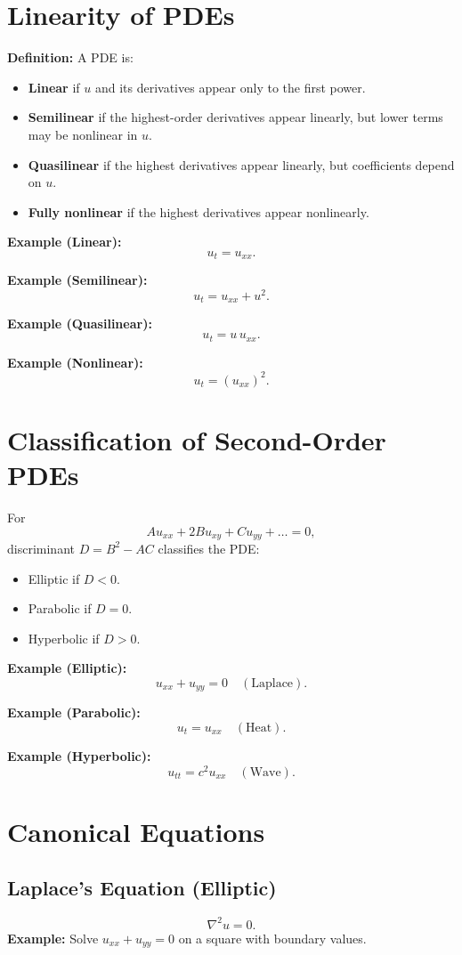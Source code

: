 \documentclass[12pt]{book}
\begin{document}
\chapter{Linearity of PDEs}
\textbf{Definition:} A PDE is:
\begin{itemize}
\item \textbf{Linear} if $u$ and its derivatives appear only to the first power.
\item \textbf{Semilinear} if the highest-order derivatives appear linearly, but lower terms may be nonlinear in $u$.
\item \textbf{Quasilinear} if the highest derivatives appear linearly, but coefficients depend on $u$.
\item \textbf{Fully nonlinear} if the highest derivatives appear nonlinearly.
\end{itemize}

\textbf{Example (Linear):}
\[
u_t = u_{xx}.
\]

\textbf{Example (Semilinear):}
\[
u_t = u_{xx} + u^2.
\]

\textbf{Example (Quasilinear):}
\[
u_t = u\,u_{xx}.
\]

\textbf{Example (Nonlinear):}
\[
u_t = (u_{xx})^2.
\]

\chapter{Classification of Second-Order PDEs}
For
\[
A u_{xx} + 2B u_{xy} + C u_{yy} + \dots = 0,
\]
discriminant $D = B^2 - AC$ classifies the PDE:
\begin{itemize}
\item Elliptic if $D < 0$.
\item Parabolic if $D = 0$.
\item Hyperbolic if $D > 0$.
\end{itemize}

\textbf{Example (Elliptic):}
\[
u_{xx} + u_{yy} = 0 \quad (\text{Laplace}).
\]

\textbf{Example (Parabolic):}
\[
u_t = u_{xx} \quad (\text{Heat}).
\]

\textbf{Example (Hyperbolic):}
\[
u_{tt} = c^2 u_{xx} \quad (\text{Wave}).
\]

\chapter{Canonical Equations}
\section*{Laplace’s Equation (Elliptic)}
\[
\nabla^2 u = 0.
\]
\textbf{Example:} Solve $u_{xx}+u_{yy}=0$ on a square with boundary values.
\end{document}
